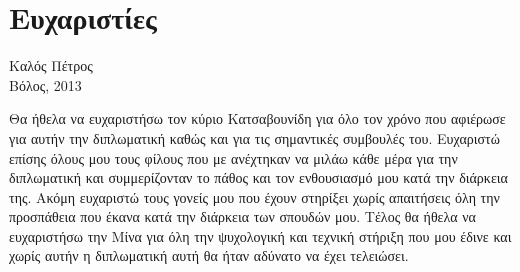 ﻿\thispagestyle{plain}
\chapter*{Ευχαριστίες}
\begin{wbepi}{Καλός Πέτρος\\ Βόλος, 2013}

\indent Θα ήθελα να ευχαριστήσω τον κύριο Κατσαβουνίδη για όλο τον χρόνο που αφιέρωσε για αυτήν την διπλωματική καθώς και για τις σημαντικές συμβουλές του.
\indent Ευχαριστώ επίσης όλους μου τους φίλους που με ανέχτηκαν να μιλάω κάθε μέρα για την διπλωματική και συμμερίζονταν το πάθος και τον ενθουσιασμό μου κατά την διάρκεια της.
\indent Ακόμη ευχαριστώ τους γονείς μου που έχουν στηρίξει χωρίς απαιτήσεις όλη την προσπάθεια που έκανα κατά την διάρκεια των σπουδών μου.
\indent Τέλος θα ήθελα να ευχαριστήσω την Μίνα για όλη την ψυχολογική και τεχνική στήριξη που μου έδινε και χωρίς αυτήν η διπλωματική αυτή θα ήταν αδύνατο να έχει τελειώσει.
 

\end{wbepi} 